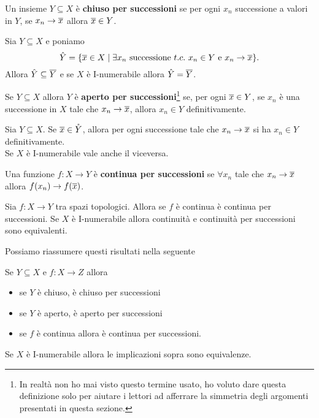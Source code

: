 \begin{multicols*}{2}
\begin{definition}
Un insieme $Y\subseteq X$ è \textbf{chiuso per successioni} se per ogni $x_n$ successione a valori in $Y$, se $x_n\to \overline{x}$ allora $\overline{x}\in Y$.
\end{definition}

\begin{proposition}
Sia $Y\subseteq X$ e poniamo
\[\hat Y=\{\overline{x}\in X\mid \exists x_n\text{ successione }t.c.\ x_n\in Y\text{ e }x_n\to\overline{x}\}.\]
Allora $\hat Y\subseteq \overline{Y}$ e se $X$ è I-numerabile allora $\hat Y=\overline{Y}$.
\end{proposition}

\begin{definition}
Se $Y\subseteq X$ allora $Y$ è \textbf{aperto per successioni}\footnote{In realtà non ho mai visto questo termine usato, ho voluto dare questa definizione solo per aiutare i lettori ad afferrare la simmetria degli argomenti presentati in questa sezione.} se, per ogni $\overline{x}\in Y$, se $x_n$ è una successione in $X$ tale che $x_n\to \overline{x}$, allora $x_n\in Y$ definitivamente.
\end{definition}

\begin{proposition}
Sia $Y\subseteq X$. Se
$\overline{x}\in{\mathring {Y}}$, allora per ogni successione tale che $x_n\to \overline{x}$ si ha $x_n\in Y$ definitivamente.\\
Se $X$ è I-numerabile vale anche il viceversa.
\end{proposition}

\begin{definition}
Una funzione $f:X\to Y$ è \textbf{continua per successioni} se $\forall x_n$ tale che $x_n\to \overline{x}$ allora $f(x_n)\to f(\overline{x})$.
\end{definition}
\begin{proposition}
Sia $f:X\to Y$ tra spazi topologici. Allora se $f$ è continua è continua per successioni. Se $X$ è I-numerabile allora continuità e continuità per successioni sono equivalenti.
\end{proposition}

\noindent Possiamo riassumere questi risultati nella seguente
\begin{proposition}\label{ChiusiApertiContinuePerSuccessioni}
Se $Y\subseteq X$ e $f:X\to Z$ allora
\begin{itemize}[noitemsep]
\item se $Y$ è chiuso, è chiuso per successioni
\item se $Y$ è aperto, è aperto per successioni
\item se $f$ è continua allora è continua per successioni.
\end{itemize}
Se $X$ è I-numerabile allora le implicazioni sopra sono equivalenze.
\end{proposition}


\end{multicols*}
